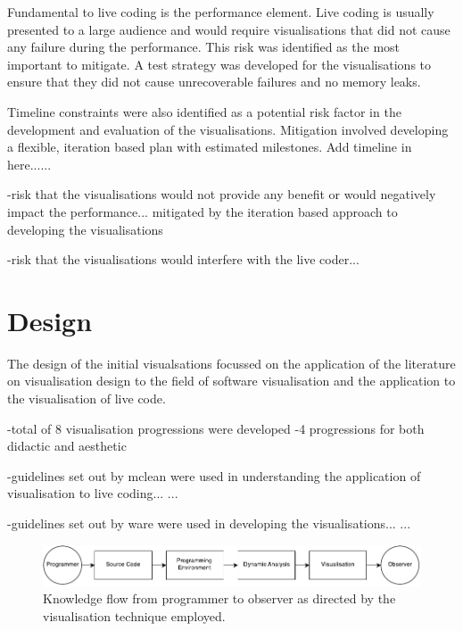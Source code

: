 Fundamental to live coding is the performance element. Live coding is usually presented to a large audience and would require visualisations that did not cause any failure during the performance. This risk was identified as the most important to mitigate. A test strategy was developed for the visualisations to ensure that they did not cause unrecoverable failures and no memory leaks.

Timeline constraints were also identified as a potential risk factor in the development and evaluation of the visualisations. Mitigation involved developing a flexible, iteration based plan with estimated milestones. {\color{red} Add timeline in here......}

-risk that the visualisations would not provide any benefit or would negatively impact the performance... mitigated by the iteration based approach to developing the visualisations

-risk that the visualisations would interfere with the live coder...



\section{Design}

The design of the initial visualsations focussed on the application of the literature on visualisation design to the field of software visualisation and the application to the visualisation of live code.

-total of 8 visualisation progressions were developed
-4 progressions for both didactic and aesthetic

-guidelines set out by mclean were used in understanding the application of visualisation to live coding...
\cite{McLean2010a}...

-guidelines set out by ware were used in developing the visualisations...
\cite{Ware2013a}...


\begin{figure}
  \centering \includegraphics[width=\columnwidth]{../images/diagrams/knowledge-flow-initial.pdf}
  \caption{Knowledge flow from programmer to observer as directed by the visualisation technique employed.}
\label{fig:knowledge-flow-initial}
\end{figure}



